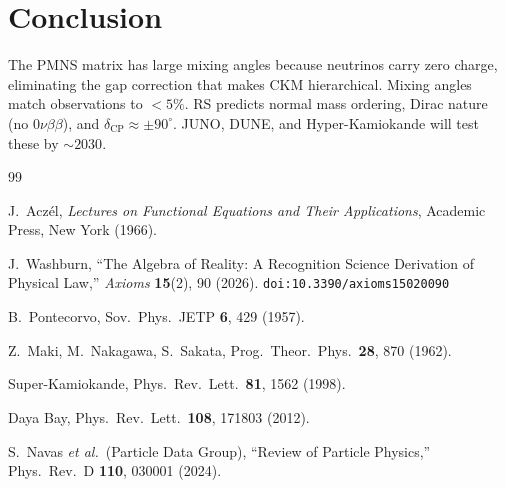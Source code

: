 \documentclass[12pt,a4paper]{article}
\theoremstyle{definition}
\theoremstyle{remark}
\begin{document}
\section{Conclusion}
\label{sec:conclusion}

The PMNS matrix has large mixing angles because neutrinos carry zero
charge, eliminating the gap correction that makes CKM hierarchical.
Mixing angles match observations to $< 5\%$.  RS predicts normal mass
ordering, Dirac nature (no $0\nu\beta\beta$), and
$\delta_{\mathrm{CP}} \approx \pm 90^\circ$.  JUNO, DUNE, and
Hyper-Kamiokande will test these by $\sim 2030$.

\begin{thebibliography}{99}

  J.~Acz\'el, \emph{Lectures on Functional Equations and Their Applications},
  Academic Press, New York (1966).

  J.~Washburn, ``The Algebra of Reality: A Recognition Science Derivation
  of Physical Law,'' \emph{Axioms} \textbf{15}(2), 90 (2026).
  \texttt{doi:10.3390/axioms15020090}

  B.~Pontecorvo, Sov.\ Phys.\ JETP \textbf{6}, 429 (1957).

  Z.~Maki, M.~Nakagawa, S.~Sakata, Prog.\ Theor.\ Phys.\ \textbf{28},
  870 (1962).

  Super-Kamiokande, Phys.\ Rev.\ Lett.\ \textbf{81}, 1562 (1998).

  Daya Bay, Phys.\ Rev.\ Lett.\ \textbf{108}, 171803 (2012).

  S.~Navas \textit{et al.}\ (Particle Data Group),
  ``Review of Particle Physics,'' Phys.\ Rev.\ D \textbf{110}, 030001
  (2024).

\end{thebibliography}
\end{document}
